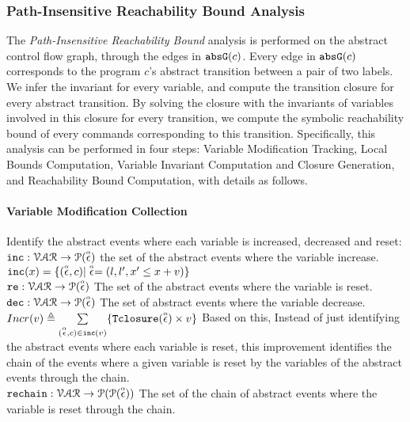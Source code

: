 \subsubsection{Path-Insensitive Reachability Bound Analysis}
\label{sec:path_insensitive_rb}
The \emph{Path-Insensitive Reachability Bound} analysis is performed on the abstract control flow graph, 
through the edges in $\mathtt{abs}{\mathtt{G}}(c)$.
Every edge in $\mathtt{abs}{\mathtt{G}}(c)$ corresponds to the program $c$'s abstract transition between a pair of two labels.
We infer the invariant for every variable, and compute the transition closure for every abstract transition. By solving the closure
with the invariants of variables involved in this closure for every transition, we compute
the symbolic reachability bound of every commands corresponding to this transition. Specifically, this analysis can be performed in four steps:
 Variable Modification Tracking, Local Bounds Computation,
Variable Invariant Computation and Closure Generation, and Reachability Bound Computation,
% 
with details as follows.
%
%
\paragraph*{Variable Modification Collection}
Identify the abstract events where each variable is increased, decreased and reset:
\\
$\mathtt{inc}: \mathcal{VAR} \to \mathcal{P}(\stackrel{\scriptscriptstyle{\alpha}}{\mathtt{\epsilon}{}}) $
the set of the abstract events where the variable increase.
\\
$\mathtt{inc}(x) = \{(\stackrel{\scriptscriptstyle{\alpha}}{\mathtt{\epsilon}{}}, c) | \stackrel{\scriptscriptstyle{\alpha}}{\mathtt{\epsilon}{}} = (l, l', x' \leq x + v)\}$
\\
$\mathtt{re}: \mathcal{VAR} \to \mathcal{P}(\stackrel{\scriptscriptstyle{\alpha}}{\mathtt{\epsilon}{}}) $
The set of the abstract events where the variable is reset.
\\
$\mathtt{dec}: \mathcal{VAR} \to \mathcal{P}(\stackrel{\scriptscriptstyle{\alpha}}{\mathtt{\epsilon}{}}) $
The set of abstract events where the variable decrease.
\\
$Incr(v) \triangleq \sum\limits_{(\stackrel{\scriptscriptstyle{\alpha}}{\mathtt{\epsilon}{}}, c) \in \mathtt{inc}(v)}\{{\mathtt{Tclosure}}(\stackrel{\scriptscriptstyle{\alpha}}{\mathtt{\epsilon}{}}) \times v\}$
%
Based on this, 
Instead of just identifying the abstract events where each variable is reset,
this improvement identifies the chain of the events where a given variable is reset by the 
variables of the abstract events through the chain.
\\
$\mathtt{rechain}: \mathcal{VAR} \to \mathcal{P}(\mathcal{P}(\stackrel{\scriptscriptstyle{\alpha}}{\mathtt{\epsilon}{}})) $
The set of the chain of abstract events where the variable is reset through the chain.
%
